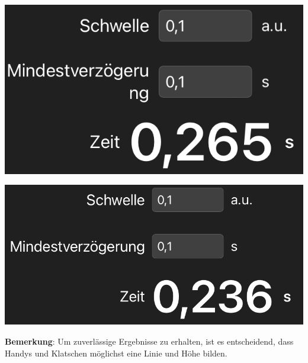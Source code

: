 \documentclass[../main.tex]{subfiles}
\begin{document}
\begin{tcolorbox}
\begin{minipage}[c]{0.62\textwidth}
 \end{minipage}
    \hspace{0.5cm}
    \begin{minipage}[c]{0.33\textwidth}
        \includegraphics[width=1\textwidth]{img/app1}
        
        \vspace{0.3cm}
        \includegraphics[width=1\textwidth]{img/app2}
 \end{minipage}
    
    \vspace{0.5cm}
    \textbf{Bemerkung}: Um zuverlässige Ergebnisse zu erhalten, ist es entscheidend, dass Handys und Klatschen möglichst eine Linie und Höhe bilden.
\end{tcolorbox}
\end{document}
